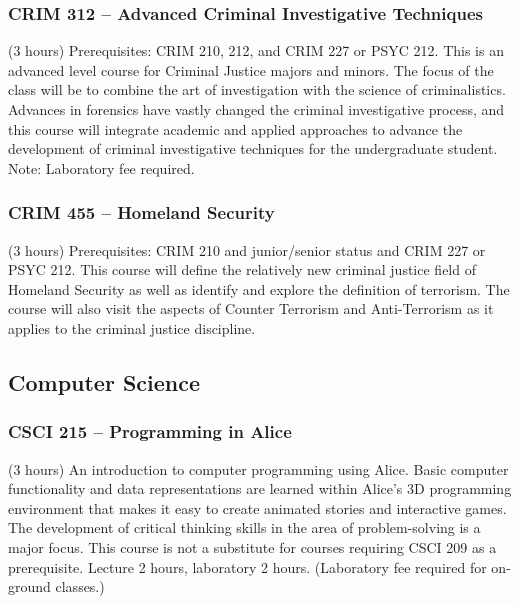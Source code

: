 \subsubsection{CRIM 312 -- Advanced Criminal Investigative Techniques}%
\label{course:CRIM:312}
(3 hours) Prerequisites: CRIM 210, 212, and CRIM 227 or PSYC 212. This is an advanced level course for Criminal Justice majors and minors. The focus of the class will be to combine the art of investigation with the science of criminalistics.  Advances in forensics have vastly changed the criminal investigative process, and this course will integrate academic and applied approaches to advance the development of criminal investigative techniques for the undergraduate student. Note: Laboratory fee required.

\subsubsection{CRIM 455 -- Homeland Security}%
\label{course:CRIM:455}
(3 hours) Prerequisites: CRIM 210 and junior/senior status and CRIM 227 or PSYC 212. This course will define the relatively new criminal justice field of Homeland Security as well as identify and explore the definition of terrorism. The course will also visit the aspects of Counter Terrorism and Anti-Terrorism as it applies to the criminal justice discipline.


\subsection{Computer Science}

\subsubsection{CSCI 215 -- Programming in Alice}%
\label{course:CSCI:215}
(3 hours) An introduction to computer programming using Alice. Basic computer functionality and data representations are learned within Alice’s 3D programming environment that makes it easy to create animated stories and interactive games. The development of critical thinking skills in the area of problem-solving is a major focus. This course is not a substitute for courses requiring CSCI 209 as a prerequisite. Lecture 2 hours, laboratory 2 hours. (Laboratory fee required for on-ground classes.)


